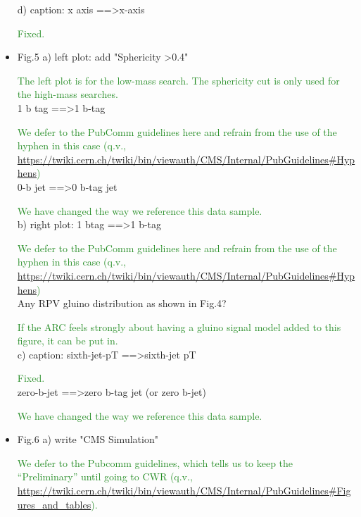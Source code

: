 \documentclass[paper=a4, fontsize=11pt]{scrartcl}
\begin{document}
\begin{itemize}
d) caption: x axis ==\textgreater x-axis 

\textcolor{ForestGreen}{Fixed.}\\

\item Fig.5 
a) left plot: 
add "Sphericity \textgreater 0.4" 

\textcolor{ForestGreen}{The left plot is for the low-mass search. The sphericity cut is only used for the
high-mass searches.}\\

1 b tag ==\textgreater 1 b-tag 

\textcolor{ForestGreen}{We defer to the PubComm guidelines here and refrain from the use of the hyphen
in this case (q.v., \url{https://twiki.cern.ch/twiki/bin/viewauth/CMS/Internal/PubGuidelines\#Hyphens})}\\


0-b jet ==\textgreater 0 b-tag jet 

\textcolor{ForestGreen}{We have changed the way we reference this data sample.}\\

b) right plot: 
1 btag ==\textgreater 1 b-tag 

\textcolor{ForestGreen}{We defer to the PubComm guidelines here and refrain from the use of the hyphen
in this case (q.v., \url{https://twiki.cern.ch/twiki/bin/viewauth/CMS/Internal/PubGuidelines\#Hyphens})}\\


Any RPV gluino distribution as shown in Fig.4? 

\textcolor{ForestGreen}{If the ARC feels strongly about having a gluino signal model added to this
figure, it can be put in.}\\

c) caption: 
sixth-jet-pT ==\textgreater sixth-jet pT 

\textcolor{ForestGreen}{Fixed.}\\

zero-b-jet ==\textgreater zero b-tag jet (or zero b-jet) 

\textcolor{ForestGreen}{We have changed the way we reference this data sample.}\\


\item Fig.6 
a) write "CMS Simulation" 

\textcolor{ForestGreen}{We defer to the Pubcomm guidelines, which tells us to keep the
``Preliminary'' until going to CWR (q.v.,
	\url{https://twiki.cern.ch/twiki/bin/viewauth/CMS/Internal/PubGuidelines\#Figures_and_tables}).}\\



\end{itemize}
\end{document}
